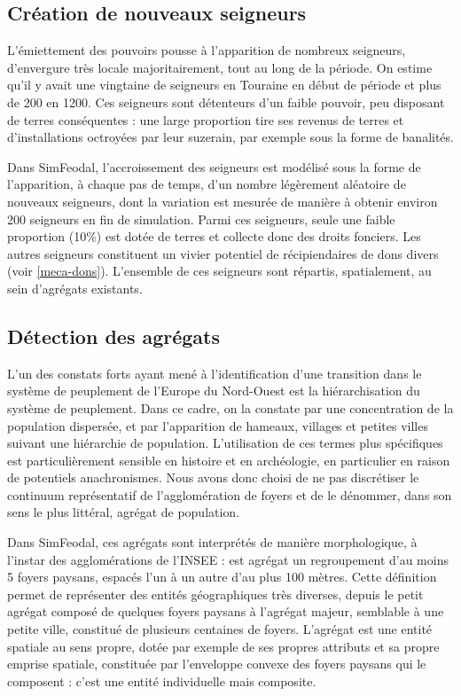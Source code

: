 \subsection{Création de nouveaux seigneurs}

L'émiettement des pouvoirs pousse à l'apparition de nombreux seigneurs, d'envergure très locale majoritairement, tout au long de la période.
On estime qu'il y avait une vingtaine de seigneurs en Touraine en début de période et plus de 200 en 1200.
Ces seigneurs sont détenteurs d'un faible pouvoir, peu disposant de terres conséquentes : une large proportion tire ses revenus de terres et d'installations octroyées par leur suzerain, par exemple sous la forme de banalités.

Dans SimFeodal, l'accroissement des seigneurs est modélisé sous la forme de l'apparition, à chaque pas de temps, d'un nombre légèrement aléatoire de nouveaux seigneurs, dont la variation est mesurée de manière à obtenir environ 200 seigneurs en fin de simulation.
Parmi ces seigneurs, seule une faible proportion (10\%) est dotée de terres et collecte donc des droits fonciers.
Les autres seigneurs constituent un vivier potentiel de récipiendaires de dons divers (voir \cref{meca-dons}).
L'ensemble de ces seigneurs sont répartis, spatialement, au sein d'agrégats existants.

\subsection{Détection des agrégats \label{meca-agregats}}

L'un des constats forts ayant mené à l'identification d'une \og transition\fg{} \autocite{pumain_convergences_2017, nuninger_cadre_2017} dans le système de peuplement de l'Europe du Nord-Ouest est la hiérarchisation du système de peuplement.
Dans ce cadre, on la constate par une concentration de la population dispersée, et par l'apparition de hameaux, villages et petites villes suivant une hiérarchie de population.
L'utilisation de ces termes plus spécifiques est particulièrement sensible en histoire et en archéologie, en particulier en raison de potentiels anachronismes.
Nous avons donc choisi de ne pas discrétiser le continuum représentatif de l'agglomération de foyers et de le dénommer, dans son sens le plus littéral, \og agrégat\fg{} de population.

Dans SimFeodal, ces agrégats sont interprétés de manière morphologique, à l'instar des agglomérations de l'INSEE : est agrégat un regroupement d'au moins 5 foyers paysans, espacés l'un à un autre d'au plus 100 mètres.
Cette définition permet de représenter des entités géographiques très diverses, depuis le petit agrégat composé de quelques foyers paysans à l'agrégat majeur, semblable à une petite ville, constitué de plusieurs centaines de foyers.
L'agrégat est une entité spatiale au sens propre, dotée par exemple de ses propres attributs et sa propre emprise spatiale, constituée par l'enveloppe convexe des foyers paysans qui le composent : c'est une entité individuelle mais composite.

